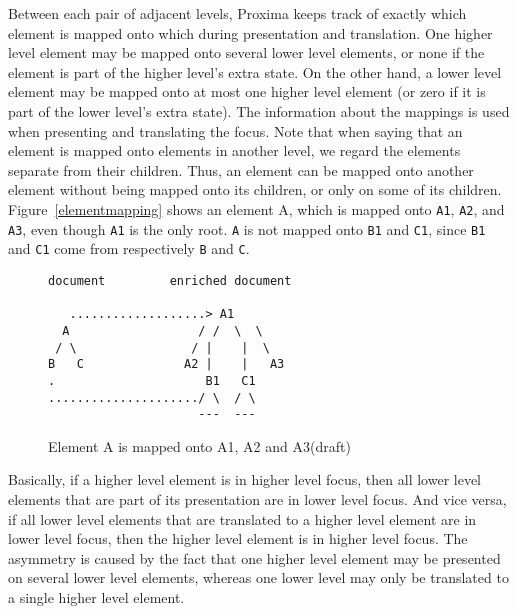 Between each pair of adjacent levels, Proxima keeps track of exactly which element is mapped onto which during presentation and translation.  One higher level element may be mapped onto several lower level elements, or none if the element is part of the higher level's extra state. On the other hand, a lower level element may be mapped onto at most one higher level element (or zero if it is part of the lower level's extra state). The information about the mappings is used when presenting and translating the focus. Note that when saying that an element is mapped onto elements in another level, we regard the elements separate from their children. Thus, an element can be mapped onto another element without being mapped onto its children, or only on some of its children. Figure~\ref{elementmapping} shows an element A, which is mapped onto \verb|A1|, \verb|A2|, and \verb|A3|, even though \verb|A1| is the only root. \verb|A| is not mapped onto \verb|B1| and \verb|C1|, since \verb|B1| and \verb|C1| come from respectively \verb|B| and \verb|C|.  

\begin{figure}
\begin{small}
\begin{center}
\begin{verbatim}
document         enriched document

   ...................> A1
  A                  / /  \  \ 
 / \                / |    |  \ 
B   C              A2 |    |   A3
.                     B1   C1  
...................../ \  / \
                     ---  ---
\end{verbatim}
\caption{Element A is mapped onto A1, A2 and A3(draft)}\label{unpresentableFocus} 
\end{center}
\end{small}
\end{figure}

Basically, if a higher level element is in higher level focus, then all lower level elements that are part of its presentation are in lower level focus. And vice versa, if all lower level elements that are translated to a higher level element are in lower level focus, then the higher level element is in higher level focus. The asymmetry is caused by the fact that one higher level element may be presented on several lower level elements, whereas one lower level may only be translated to a single higher level element.

